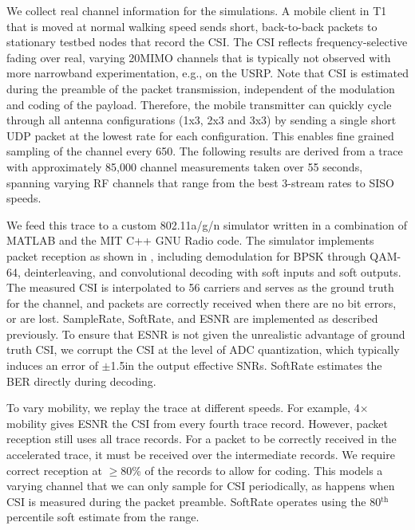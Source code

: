 
 We collect real channel information for the simulations. A mobile client in T1 that is moved at normal walking speed sends short, back-to-back packets to stationary testbed nodes that record the CSI\@. The CSI reflects frequency-selective fading over real, varying 20\MHz MIMO channels that is typically not observed with more narrowband experimentation, e.g., on the USRP\@. Note that CSI is estimated during the preamble of the packet transmission, independent of the modulation and coding of the payload. Therefore, the mobile transmitter can quickly cycle through all antenna configurations (1x3, 2x3 and 3x3) by sending a single short UDP packet at the lowest rate for each configuration. This enables fine grained sampling of the channel every 650\us. The following results are derived from a trace with approximately 85,000 channel measurements taken over 55 seconds, spanning varying RF channels that range from the best 3-stream rates to SISO speeds.

 We feed this trace to a custom 802.11a/g/n simulator written in a combination of MATLAB and the MIT C++ GNU Radio code. The simulator implements packet reception as shown in , including demodulation for BPSK through QAM-64, deinterleaving, and convolutional decoding with soft inputs and soft outputs. The measured CSI is interpolated to 56 carriers and serves as the ground truth for the channel, and packets are correctly received when there are no bit errors, or are lost. SampleRate, SoftRate, and ESNR are implemented as described previously. To ensure that ESNR is not given the unrealistic advantage of ground truth CSI, we corrupt the CSI at the level of ADC quantization, which typically induces an error of $\pm$1.5\dB in the output effective SNRs. SoftRate estimates the BER directly during decoding.

To vary mobility, we replay the trace at different speeds. For example, 4$\times$ mobility gives ESNR the CSI from every fourth trace record. However, packet reception still uses all trace records. For a packet to be correctly received in the accelerated trace, it must be received over the intermediate records. We require correct reception at $\geq$80\% of the records to allow for coding. This models a varying channel that we can only sample for CSI periodically, as happens when CSI is measured during the packet preamble. SoftRate operates using the 80$^\text{th}$ percentile soft estimate from the range.

